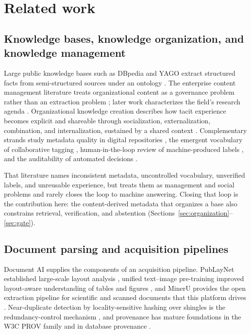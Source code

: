 \section{Related work}
\label{sec:related}

\subsection{Knowledge bases, knowledge organization, and knowledge management}
Large public knowledge bases such as DBpedia and YAGO extract structured facts
from semi-structured sources under an ontology
\citep{auer-dbpedia-kb-2007,hoffart-yago2-kb-2013}. The enterprise content
management literature treats organizational content as a governance problem
rather than an extraction problem \citep{paivarinta-ecm-2005}; later work
characterizes the field's research agenda \citep{tyrvaainen-ecm-2006}.
Organizational knowledge creation describes how tacit experience becomes
explicit and shareable through socialization, externalization, combination, and
internalization, sustained by a shared context
\citep{nonaka-seci-1994,nonaka-seci-ba-2000}. Complementary strands study
metadata quality in digital repositories \citep{park-metadata-quality-2009}, the
emergent vocabulary of collaborative tagging \citep{golder-tagging-2006},
human-in-the-loop review of machine-produced labels
\citep{mosqueira-rey-hitl-2022}, and the auditability of automated decisions
\citep{barredo-arrieta-xai-2020}.

That literature names inconsistent metadata, uncontrolled vocabulary, unverified
labels, and unreusable experience, but treats them as management and social
problems and rarely closes the loop to machine answering. Closing that loop is
the contribution here: the content-derived metadata that organizes a base also
constrains retrieval, verification, and abstention
(Sections~\ref{sec:organization}--\ref{sec:gate}).

\subsection{Document parsing and acquisition pipelines}
Document AI supplies the components of an acquisition pipeline. PubLayNet
established large-scale layout analysis \citep{zhong-publaynet-layout-2019},
unified text--image pre-training improved layout-aware understanding of tables
and figures \citep{huang-layoutlmv3-docai-2022}, and MinerU provides the open
extraction pipeline for scientific and scanned documents that this platform
drives \citep{mineru}. Near-duplicate detection by locality-sensitive hashing
over shingles is the redundancy-control mechanism
\citep{manku-near-dup-2007}, and provenance has mature foundations in the W3C
PROV family \citep{missier-prov-2013} and in database provenance
\citep{cheney-provenance-2009}.

